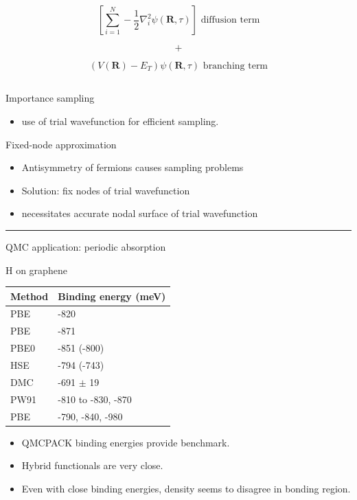 \documentclass[
  letterpaper,
  DIV=11,
  numbers=noendperiod]{scrartcl}
\providecommand{\tightlist}{%
  \setlength{\itemsep}{0pt}\setlength{\parskip}{0pt}}\usepackage{longtable,booktabs,array}
\begin{document}
\[\left[\sum_{i=1}^{N}-\frac{1}{2} \nabla_{i}^{2} \psi(\mathbf{R}, \tau)\right] \text{ diffusion term}\]

\[+\]

\[\left(V(\mathbf{R})-E_{T}\right) \psi(\mathbf{R}, \tau) \text{ branching term}\]

\hypertarget{section}{%
\subsection{}\label{section}}

Importance sampling

\begin{itemize}
\tightlist
\item
  use of trial wavefunction for efficient sampling.
\end{itemize}

Fixed-node approximation

\begin{itemize}
\tightlist
\item
  Antisymmetry of fermions causes sampling problems
\item
  Solution: fix nodes of trial wavefunction
\item
  necessitates accurate nodal surface of trial wavefunction
\end{itemize}

\begin{center}\rule{0.5\linewidth}{0.5pt}\end{center}

QMC application:{ periodic absorption}

H on graphene

\begin{longtable}[]{@{}ll@{}}
\toprule()
Method & Binding energy (meV) \\
\midrule()
\endhead
PBE & -820 \\
PBE & -871 \\
PBE0 & -851 (-800) \\
HSE & -794 (-743) \\
DMC & -691 \(\pm\) 19 \\
PW91 & -810 to -830, -870 \\
PBE & -790, -840, -980 \\
\bottomrule()
\end{longtable}

\begin{itemize}
\tightlist
\item
  QMCPACK binding energies provide benchmark.
\item
  Hybrid functionals are very close.
\item
  Even with close binding energies, density seems to disagree in bonding
  region.
\end{itemize}
\end{document}

